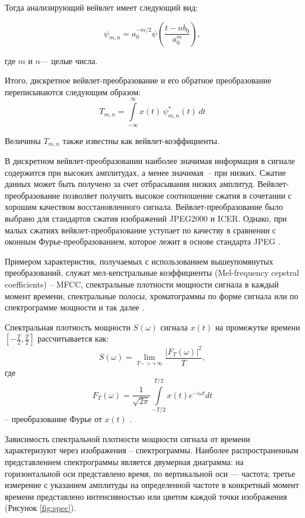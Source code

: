 Тогда анализирующий вейвлет имеет следующий вид:

\begin{equation}
	\psi _{{m,n}}=a_{0}^{{-m/2}}\psi \left({\frac {t-nb_{0}}{a_{0}^{m}}}\right),
\end{equation}

где $m$ и $n$— целые числа.

Итого, дискретное вейвлет-преобразование и его обратное преобразование переписываются следующим образом:
\begin{equation}
	T_{{m,n}}=\int \limits _{{-\infty }}^{{\infty }}x(t)\,\psi _{{m,n}}^{*}(t)\,dt
\end{equation}

Величины $T_{{m,n}}$ также известны как вейвлет-коэффициенты.

В дискретном вейвлет-преобразовании наиболее значимая информация в сигнале содержится при высоких амплитудах, а менее значимая -- при низких.
Сжатие данных может быть получено за счет отбрасывания низких амплитуд.
Вейвлет-преобразование позволяет получить высокое соотношение сжатия в сочетании с хорошим качеством восстановленного сигнала. 
Вейвлет-преобразование было выбрано для стандартов сжатия изображений JPEG2000 и ICER.
Однако, при малых сжатиях вейвлет-преобразование уступает по качеству в сравнении с оконным Фурье-преобразованием, которое лежит в основе стандарта JPEG \cite{wavelet}. 

Примером характеристик, получаемых с использованием вышеупомянутых преобразований, служат мел-кепстральные коэффициенты (Mel-frequency cepstral coefficients) -- MFCC,
спектральные плотности мощности сигнала в каждый момент времени, 
спектральные полосы, хроматограммы по форме сигнала или по спектрограмме мощности и так далее \cite{mus_zhao}.

Спектральная плотность мощности $S(\omega)$ сигнала $x(t)$ на промежутке времени $\left[-\frac{T}{2},\frac{T}{2}\right]$ рассчитывается как:
\begin{equation}
	S(\omega) = \lim_{T->+\infty} \frac{\left|F_T(\omega)\right|^2}{T},
\end{equation}
где
\begin{equation}
	F_{T}(\omega )={\frac {1}{\sqrt {2\pi }}}\int \limits _{-T/2}^{T/2}x(t)e^{-i\omega t} dt
\end{equation}
-- преобразование Фурье	от $x(t)$ \cite{otnes}.

Зависимость спектральной плотности мощности сигнала от времени характеризуют через изображения -- спектрограммы.
Наиболее распространенным представлением спектрограммы является двумерная диаграмма: на горизонтальной оси представлено время, 
по вертикальной оси — частота; третье измерение с указанием амплитуды на определенной частоте в конкретный момент времени представлено 
интенсивностью или цветом каждой точки изображения (Рисунок \ref{fig:spec}).

